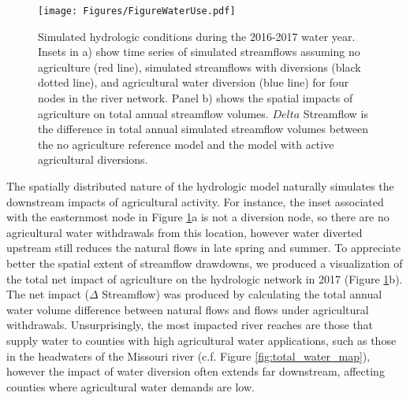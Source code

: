 \begin{figure}
\texttt{[image: Figures/FigureWaterUse.pdf]}
\label{fig:map_water_change}
\caption{Simulated hydrologic conditions during the 2016-2017 water year. Insets in a) show  time series of simulated streamflows assuming no agriculture (red line), simulated streamflows with diversions (black dotted line), and agricultural water diversion (blue line) for four nodes in the river network. Panel b) shows the spatial impacts of agriculture on total annual streamflow volumes. $Delta$ Streamflow is the difference in total annual simulated streamflow volumes between the no agriculture reference model and the model with active agricultural diversions.}
\end{figure}

The spatially distributed nature of the hydrologic model naturally simulates the downstream impacts of agricultural activity. For instance, the inset associated with the easternmost node in Figure \ref{fig:map_water_change}a is not a diversion node, so there are no agricultural water withdrawals from this location, however water diverted upstream still reduces the natural flows in late spring and summer. To appreciate better the spatial extent of streamflow drawdowns, we produced a visualization of the total net impact of agriculture on the hydrologic network in 2017 (Figure \ref{fig:map_water_change}b). The net impact ($\Delta$ Streamflow) was produced by calculating the total annual water volume difference between natural flows and flows under agricultural withdrawals. Unsurprisingly, the most impacted river reaches are those that supply water to counties with high agricultural water applications, such as those in the headwaters of the Missouri river (c.f. Figure \ref{fig:total_water_map}), however the impact of water diversion often extends far downstream, affecting counties where agricultural water demands are low. 
